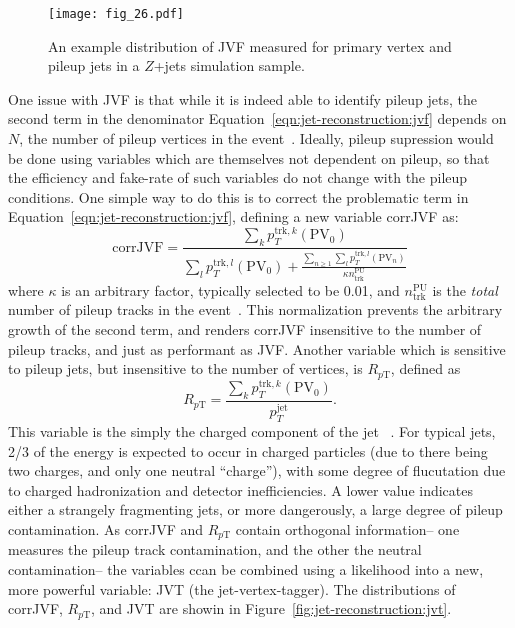 
\begin{figure}
\centering
\texttt{[image: fig\_26.pdf]}
\label{fig:jet-reconstruction:jvf}
\caption{An example distribution of JVF measured for primary vertex and pileup jets in a $Z$+jets simulation sample.}
\end{figure}


One issue with JVF is that while it is indeed able to identify pileup jets, the second term in the denominator Equation~\ref{eqn:jet-reconstruction:jvf} depends on $N$, the number of pileup vertices in the event~\cite{ATLAS-JVT}. Ideally, pileup supression would be done using variables which are themselves not dependent on pileup, so that the efficiency and fake-rate of such variables do not change with the pileup conditions. One simple way to do this is to correct the problematic term in  Equation~\ref{eqn:jet-reconstruction:jvf}, defining a new variable corrJVF as:
%
\begin{equation}
\label{eqn:jet-reconstruction:corrjvf}
\mathrm{corrJVF} = \frac{\sum_k p_T^{\mathrm{trk},k}(\mathrm{PV}_0)}{ \sum_l p_T^{\mathrm{trk},l}(\mathrm{PV}_0) + \frac{\sum_{n\geq1} \sum_l p_T^{\mathrm{trk},l}(\mathrm{PV}_n)}{\kappa n_\mathrm{trk}^\mathrm{PU}}}
\end{equation}
%
where $\kappa$ is an arbitrary factor, typically selected to be 0.01, and $n_\mathrm{trk}^\mathrm{PU}$ is the \textit{total} number of pileup tracks in the event~\cite{ATLAS-JVT}. This normalization prevents the arbitrary growth of the second term, and renders corrJVF insensitive to the number of pileup tracks, and just as performant as JVF. Another variable which is sensitive to pileup jets, but insensitive to the number of vertices, is $R_{p\mathrm{T}}$, defined as
%
\begin{equation}
R_{p\mathrm{T}} = \frac{\sum_k p_T^{\mathrm{trk},k}(\mathrm{PV}_0)}{p_T^\mathrm{jet}}.
\end{equation}
%
This variable is the simply the charged component of the jet \pt~\cite{ATLAS-JVT}. For typical jets, 2/3 of the energy is expected to occur in charged particles (due to there being two charges, and only one neutral ``charge''), with some degree of flucutation due to charged hadronization and detector inefficiencies. A lower value indicates either a strangely fragmenting jets, or more dangerously, a large degree of pileup contamination. As corrJVF and $R_{p\mathrm{T}}$ contain orthogonal information-- one measures the pileup track contamination, and the other the neutral contamination-- the variables ccan be combined using a likelihood into a new, more powerful variable: JVT (the jet-vertex-tagger). The distributions of corrJVF, $R_{p\mathrm{T}}$, and JVT are showin in Figure~\ref{fig:jet-reconstruction:jvt}.

